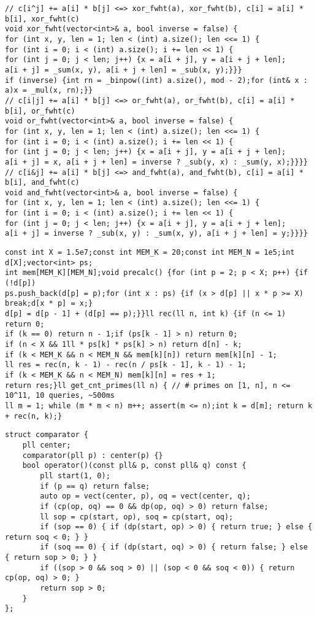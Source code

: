 \documentclass[12pt]{article}
\begin{document}
\begin{verbatim}
// c[i^j] += a[i] * b[j] <=> xor_fwht(a), xor_fwht(b), c[i] = a[i] * b[i], xor_fwht(c)
void xor_fwht(vector<int>& a, bool inverse = false) {
for (int x, y, len = 1; len < (int) a.size(); len <<= 1) {
for (int i = 0; i < (int) a.size(); i += len << 1) {
for (int j = 0; j < len; j++) {x = a[i + j], y = a[i + j + len];
a[i + j] = _sum(x, y), a[i + j + len] = _sub(x, y);}}}
if (inverse) {int rn = _binpow((int) a.size(), mod - 2);for (int& x : a)x = _mul(x, rn);}}
// c[i|j] += a[i] * b[j] <=> or_fwht(a), or_fwht(b), c[i] = a[i] * b[i], or_fwht(c)
void or_fwht(vector<int>& a, bool inverse = false) {
for (int x, y, len = 1; len < (int) a.size(); len <<= 1) {
for (int i = 0; i < (int) a.size(); i += len << 1) {
for (int j = 0; j < len; j++) {x = a[i + j], y = a[i + j + len];
a[i + j] = x, a[i + j + len] = inverse ? _sub(y, x) : _sum(y, x);}}}}
// c[i&j] += a[i] * b[j] <=> and_fwht(a), and_fwht(b), c[i] = a[i] * b[i], and_fwht(c)
void and_fwht(vector<int>& a, bool inverse = false) {
for (int x, y, len = 1; len < (int) a.size(); len <<= 1) {
for (int i = 0; i < (int) a.size(); i += len << 1) {
for (int j = 0; j < len; j++) {x = a[i + j], y = a[i + j + len];
a[i + j] = inverse ? _sub(x, y) : _sum(x, y), a[i + j + len] = y;}}}}
\end{verbatim}

\begin{verbatim}
const int X = 1.5e7;const int MEM_K = 20;const int MEM_N = 1e5;int d[X];vector<int> ps;
int mem[MEM_K][MEM_N];void precalc() {for (int p = 2; p < X; p++) {if (!d[p])
ps.push_back(d[p] = p);for (int x : ps) {if (x > d[p] || x * p >= X) break;d[x * p] = x;}
d[p] = d[p - 1] + (d[p] == p);}}ll rec(ll n, int k) {if (n <= 1) return 0;
if (k == 0) return n - 1;if (ps[k - 1] > n) return 0;
if (n < X && 1ll * ps[k] * ps[k] > n) return d[n] - k;
if (k < MEM_K && n < MEM_N && mem[k][n]) return mem[k][n] - 1;
ll res = rec(n, k - 1) - rec(n / ps[k - 1], k - 1) - 1;
if (k < MEM_K && n < MEM_N) mem[k][n] = res + 1;
return res;}ll get_cnt_primes(ll n) { // # primes on [1, n], n <= 10^11, 10 queries, ~500ms
ll m = 1; while (m * m < n) m++; assert(m <= n);int k = d[m]; return k + rec(n, k);}
\end{verbatim}

\begin{verbatim}
struct comparator {
    pll center;
    comparator(pll p) : center(p) {}
    bool operator()(const pll& p, const pll& q) const {
        pll start(1, 0);
        if (p == q) return false;
        auto op = vect(center, p), oq = vect(center, q);
        if (cp(op, oq) == 0 && dp(op, oq) > 0) return false;
        ll sop = cp(start, op), soq = cp(start, oq);
        if (sop == 0) { if (dp(start, op) > 0) { return true; } else { return soq < 0; } }
        if (soq == 0) { if (dp(start, oq) > 0) { return false; } else { return sop > 0; } }
        if ((sop > 0 && soq > 0) || (sop < 0 && soq < 0)) { return cp(op, oq) > 0; }
        return sop > 0;
    }
};
\end{verbatim}
\end{document}

